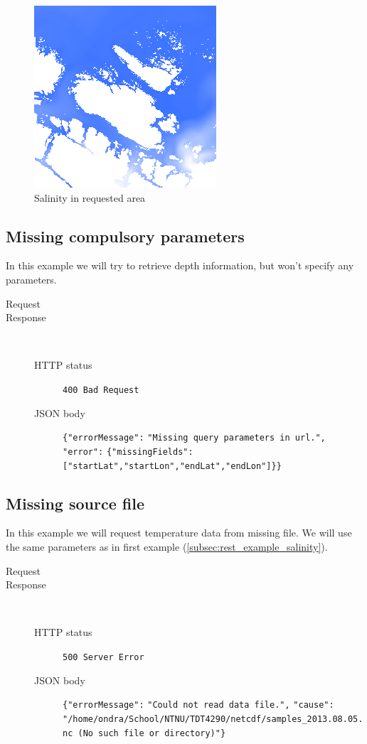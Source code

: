 \documentclass[11pt,a4paper,titlepage,oneside]{report}
\begin{document}
\begin{figure}[h]
	\centering
	\includegraphics{img/REST_example_1.png}
	\caption{Salinity in requested area}
	\label{fig:rest_example_1}
\end{figure}

\subsection{Missing compulsory parameters}
In this example we will try to retrieve depth information, but won't specify any parameters.

\begin{description}
	\item[Request] 
	\item[Response] ~\\
		\begin{description}
			\item[\gls{HTTP} status] \texttt{400 Bad Request}
			\item[\gls{JSON} body] \texttt{\{"errorMessage":} \texttt{"Missing~query~parameters~in~url.",} \texttt{"error":} \texttt{\{"missingFields":} \texttt{["startLat","startLon","endLat","endLon"]\}\}}
		\end{description}
\end{description}

\subsection{Missing source file}
In this example we will request temperature data from missing file. We will use the same parameters as in first example (\ref{subsec:rest_example_salinity}).

\begin{description}
	\item[Request] 
	\item[Response] ~\\
		\begin{description}
			\item[\gls{HTTP} status] \texttt{500 Server Error}
			\item[\gls{JSON} body] \texttt{\{"errorMessage":} \texttt{"Could not read data file.",} \texttt{"cause":} \texttt{"/home/ondra/School/NTNU/TDT4290/netcdf/samples\_2013.08.05.nc (No such file or directory)"\}}
		\end{description}
\end{description}
\end{document}
